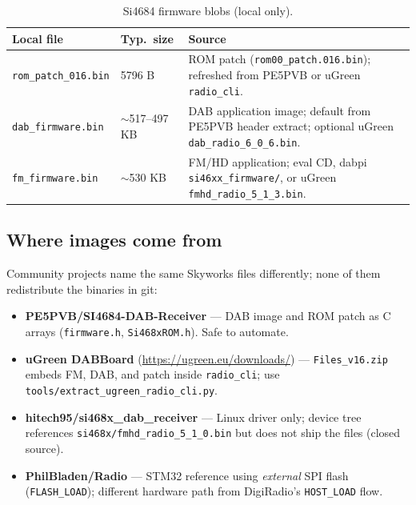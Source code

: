 \begin{table}[htbp]
  \centering
  \footnotesize
  \begin{tabular}{@{}L{3.2cm}L{2.2cm}L{8.2cm}@{}}
    \toprule
    \textbf{Local file} & \textbf{Typ.\ size} & \textbf{Source} \\
    \midrule
    \texttt{rom\_patch\_016.bin} & 5796 B &
      ROM patch (\texttt{rom00\_patch.016.bin}); refreshed from
      PE5PVB or uGreen \texttt{radio\_cli}. \\
    \texttt{dab\_firmware.bin} & $\sim$517--497 KB &
      DAB application image; default from PE5PVB header extract; optional
      uGreen \texttt{dab\_radio\_6\_0\_6.bin}. \\
    \texttt{fm\_firmware.bin} & $\sim$530 KB &
      FM/HD application; eval CD, dabpi \texttt{si46xx\_firmware/}, or uGreen
      \texttt{fmhd\_radio\_5\_1\_3.bin}. \\
    \bottomrule
  \end{tabular}
  \caption{Si4684 firmware blobs (local only).}
  \label{tab:si4684-blobs}
\end{table}

\subsection{Where images come from}
\label{sec:si4684-sources}

Community projects name the same Skyworks files differently; none of them
redistribute the binaries in git:

\begin{itemize}
  \item \textbf{PE5PVB/SI4684-DAB-Receiver} --- DAB image and ROM patch as
    C arrays (\texttt{firmware.h}, \texttt{Si468xROM.h}). Safe to automate.
  \item \textbf{uGreen DABBoard} (\url{https://ugreen.eu/downloads/}) ---
    \texttt{Files\_v16.zip} embeds FM, DAB, and patch inside
    \texttt{radio\_cli}; use \texttt{tools/extract\_ugreen\_radio\_cli.py}.
  \item \textbf{hitech95/si468x\_dab\_receiver} --- Linux driver only; device
    tree references \texttt{si468x/fmhd\_radio\_5\_1\_0.bin} but does not
    ship the files (closed source).
  \item \textbf{PhilBladen/Radio} --- STM32 reference using \emph{external}
    SPI flash (\texttt{FLASH\_LOAD}); different hardware path from DigiRadio's
    \texttt{HOST\_LOAD} flow.
\end{itemize}

